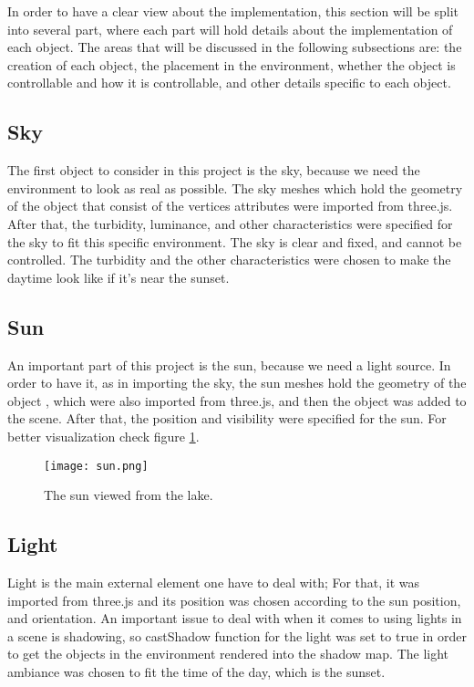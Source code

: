 \documentclass[paper=a4, fontsize=11pt]{scrartcl} %
\numberwithin{equation}{section} %
\numberwithin{figure}{section} %
\numberwithin{table}{section} %
\begin{document}
In order to have a clear view about the implementation, this section will be split into several part, where each part will hold details about the implementation of each object. The areas that will be discussed in the following subsections are: the creation of each object, the placement in the environment, whether the object is controllable and how it is controllable, and other details specific to each object.

\subsection{Sky}

The first object to consider in this project is the sky, because we need the environment to look as real as possible. The sky meshes which hold the geometry of the object that consist of the vertices attributes were imported from three.js. After that, the turbidity, luminance, and other characteristics were specified for the sky to fit this specific environment. The sky is clear and fixed, and cannot be controlled. The turbidity and the other characteristics were chosen to make the daytime look like if it's near the sunset.

\subsection{Sun}

An important part of this project is the sun, because we need a light source. In order to have it, as in importing the sky, the sun meshes hold the geometry of the object , which were also imported from three.js, and then the object was added to the scene. After that, the position and visibility were specified for the sun. For better visualization check figure \ref{sun}.

\begin{figure}[!ht]
\centering
\texttt{[image: sun.png]}
\caption{The sun viewed from the lake.}
\label{sun}
\end{figure}
\newpage

\subsection{Light}

Light is the main external element one have to deal with; For that, it was imported from three.js and its position was chosen according to the sun position, and orientation. An important issue to deal with when it comes to using lights in a scene is shadowing, so castShadow function for the light was set to true in order to get the objects in the environment rendered into the shadow map. The light ambiance was chosen to fit the time of the day, which is the sunset.
\end{document}
